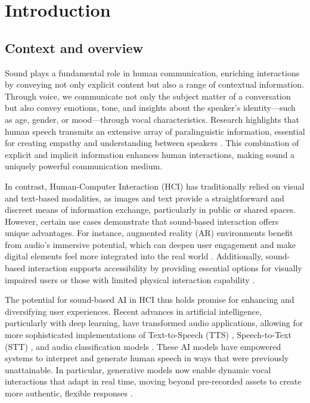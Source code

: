 \section{Introduction}

\subsection{Context and overview}

Sound plays a fundamental role in human communication, enriching interactions by conveying not only explicit content but also a range of contextual information. Through voice, we communicate not only the subject matter of a conversation but also convey emotions, tone, and insights about the speaker’s identity—such as age, gender, or mood—through vocal characteristics. Research highlights that human speech transmits an extensive array of paralinguistic information, essential for creating empathy and understanding between speakers \cite{schuller2013paralinguistics}. This combination of explicit and implicit information enhances human interactions, making sound a uniquely powerful communication medium.

In contrast, Human-Computer Interaction (HCI) has traditionally relied on visual and text-based modalities, as images and text provide a straightforward and discreet means of information exchange, particularly in public or shared spaces. However, certain use cases demonstrate that sound-based interaction offers unique advantages. For instance, augmented reality (AR) environments benefit from audio's immersive potential, which can deepen user engagement and make digital elements feel more integrated into the real world \cite{yang2022audio}. Additionally, sound-based interaction supports accessibility by providing essential options for visually impaired users or those with limited physical interaction capability \cite{brock2015interactive}.

The potential for sound-based AI in HCI thus holds promise for enhancing and diversifying user experiences. Recent advances in artificial intelligence, particularly with deep learning, have transformed audio applications, allowing for more sophisticated implementations of Text-to-Speech (TTS) \cite{ren2020fastspeech}, Speech-to-Text (STT) \cite{inaguma2020espnet}, and audio classification models \cite{gemmeke2017audio}. These AI models have empowered systems to interpret and generate human speech in ways that were previously unattainable. In particular, generative models now enable dynamic vocal interactions that adapt in real time, moving beyond pre-recorded assets to create more authentic, flexible responses \cite{brown2020language}.

